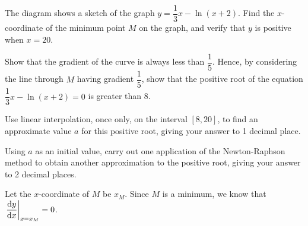\documentclass{echw}
\begin{document}
    \problem{}
        \begin{center}
        \end{center}

        The diagram shows a sketch of the graph $y = \dfrac13 x - \ln (x+2)$. Find the $x$-coordinate of the minimum point $M$ on the graph, and verify that $y$ is positive when $x = 20$.

        Show that the gradient of the curve is always less than $\dfrac15$. Hence, by considering the line through $M$ having gradient $\dfrac15$, show that the positive root of the equation $\dfrac13 x - \ln (x+2) = 0$ is greater than 8.

        Use linear interpolation, once only, on the interval $[8, 20]$, to find an approximate value $a$ for this positive root, giving your answer to 1 decimal place.

        Using $a$ as an initial value, carry out one application of the Newton-Raphson method to obtain another approximation to the positive root, giving your answer to 2 decimal places.

    \solution
        Let the $x$-coordinate of $M$ be $x_M$. Since $M$ is a minimum, we know that $\left. \dfrac{\mathrm{d} y}{\mathrm{d} x} \right|_{x = x_M} = 0$.
        
\end{document}
